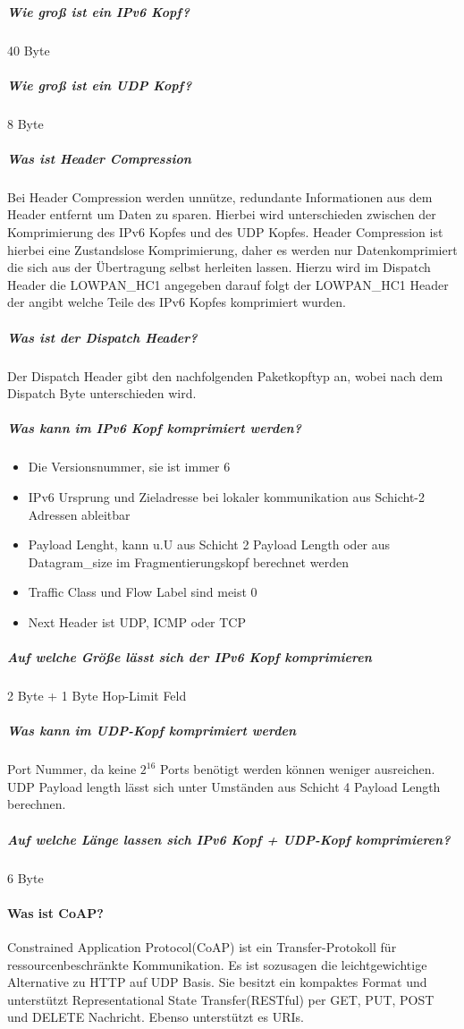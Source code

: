 	\subparagraph{Wie groß ist ein IPv6 Kopf?} 
	40 Byte
	
	\subparagraph{Wie groß ist ein UDP Kopf?}
	8 Byte
	
	\subparagraph{Was ist Header Compression}
	Bei Header Compression werden unnütze, redundante Informationen aus dem Header entfernt um Daten zu sparen. 
	Hierbei wird unterschieden zwischen der Komprimierung des IPv6 Kopfes und des UDP Kopfes.
	Header Compression ist hierbei eine Zustandslose Komprimierung, daher es werden nur Datenkomprimiert die sich aus der Übertragung selbst herleiten lassen.
	Hierzu wird im Dispatch Header die LOWPAN_HC1 angegeben darauf folgt der LOWPAN_HC1 Header der angibt welche Teile des IPv6 Kopfes komprimiert wurden.
	
	\subparagraph{Was ist der Dispatch Header?}
	Der Dispatch Header gibt den nachfolgenden Paketkopftyp an, wobei nach dem Dispatch Byte unterschieden wird.
	
	
	\subparagraph{Was kann im IPv6 Kopf komprimiert werden?}
		\begin{itemize}
			\item Die Versionsnummer, sie ist immer 6
			\item IPv6 Ursprung und Zieladresse bei lokaler kommunikation aus Schicht-2 Adressen ableitbar
			\item Payload Lenght, kann u.U aus Schicht 2 Payload Length oder aus Datagram_size im Fragmentierungskopf berechnet werden
			\item Traffic Class und Flow Label sind meist 0
			\item Next Header ist UDP, ICMP oder TCP
		\end{itemize}
			
		
		\subparagraph{Auf welche Größe lässt sich der IPv6 Kopf komprimieren}
		2 Byte + 1 Byte Hop-Limit Feld
		
	\subparagraph{Was kann im UDP-Kopf komprimiert werden}
	Port Nummer, da keine $2^{16}$ Ports benötigt werden können weniger ausreichen. UDP Payload length lässt sich unter Umständen aus Schicht 4 Payload Length berechnen.
	
	\subparagraph{Auf welche Länge  lassen sich IPv6 Kopf + UDP-Kopf komprimieren?}
	6 Byte
	
	\paragraph{Was ist CoAP?}
	Constrained Application Protocol(CoAP) ist ein Transfer-Protokoll für ressourcenbeschränkte Kommunikation. Es ist sozusagen die leichtgewichtige Alternative zu HTTP auf UDP Basis. Sie besitzt ein kompaktes Format und unterstützt Representational State Transfer(RESTful) per GET, PUT, POST und DELETE Nachricht. Ebenso unterstützt es URIs.
	
